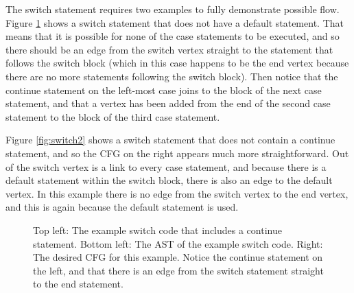The switch statement requires two examples to fully demonstrate possible flow. Figure \ref{fig:switch1} shows a switch statement that does not have a default statement. That means that it is possible for none of the case statements to be executed, and so there should be an edge from the switch vertex straight to the statement that follows the switch block (which in this case happens to be the end vertex because there are no more statements following the switch block). Then notice that the continue statement on the left-most case joins to the block of the next case statement, and that a vertex has been added from the end of the second case statement to the block of the third case statement.

Figure \ref{fig:switch2} shows a switch statement that does not contain a continue statement, and so the CFG on the right appears much more straightforward. Out of the switch vertex is a link to every case statement, and because there is a default statement within the switch block, there is also an edge to the default vertex. In this example there is no edge from the switch vertex to the end vertex, and this is again because the default statement is used.

\begin{figure}
\centering
\begin{minipage}{.6\textwidth}
  \centering
  
\end{minipage}%
\begin{minipage}{.3\textwidth}
  \centering
\end{minipage}
\caption{Top left: The example switch code that includes a continue statement. Bottom left: The AST of the example switch code. Right: The desired CFG for this example. Notice the continue statement on the left, and that there is an edge from the switch statement straight to the end statement.}
\label{fig:switch1}
\end{figure}

